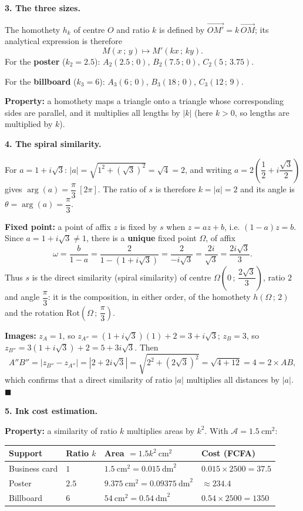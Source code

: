 \documentclass[11pt]{article}
\newcommand{\cle}[1]{{\popxbold\color{popdark}#1}}
\begin{document}
\textbf{3. The three sizes.}\par
The homothety $h_k$ of centre $O$ and ratio $k$ is defined by $\overrightarrow{OM'} = k\,\overrightarrow{OM}$; its analytical expression is therefore
\[ M(x\,;\,y) \longmapsto M'(kx\,;\,ky). \]
For the \textbf{poster} ($k_2 = 2.5$): $A_2(2.5\,;\,0)$, $B_2(7.5\,;\,0)$, $C_2(5\,;\,3.75)$.\par
For the \textbf{billboard} ($k_3 = 6$): $A_3(6\,;\,0)$, $B_3(18\,;\,0)$, $C_3(12\,;\,9)$.\par
\textbf{Property:} a homothety maps a triangle onto a triangle whose corresponding sides are parallel, and it multiplies all lengths by $|k|$ (here $k > 0$, so lengths are multiplied by $k$).

\textbf{4. The spiral similarity.}\par
For $a = 1 + i\sqrt{3}$: $|a| = \sqrt{1^{2} + (\sqrt{3})^{2}} = \sqrt{4} = 2$, and writing $a = 2\left(\dfrac{1}{2} + i\dfrac{\sqrt{3}}{2}\right)$ gives $\arg(a) = \dfrac{\pi}{3}\ [2\pi]$. The ratio of $s$ is therefore $k = |a| = 2$ and its angle is $\theta = \arg(a) = \dfrac{\pi}{3}$.\par
\textbf{Fixed point:} a point of affix $z$ is fixed by $s$ when $z = az + b$, i.e. $(1-a)z = b$. Since $a = 1 + i\sqrt{3} \neq 1$, there is a \textbf{unique} fixed point $\Omega$, of affix
\[ \omega = \frac{b}{1 - a} = \frac{2}{1 - (1 + i\sqrt{3})} = \frac{2}{-i\sqrt{3}} = \frac{2i}{\sqrt{3}} = \frac{2i\sqrt{3}}{3}. \]
Thus $s$ is the \cle{direct similarity} (spiral similarity) of centre $\Omega\left(0\,;\,\dfrac{2\sqrt{3}}{3}\right)$, ratio $2$ and angle $\dfrac{\pi}{3}$: it is the composition, in either order, of the homothety $h\!\left(\Omega\,;\,2\right)$ and the rotation $\mathrm{Rot}\!\left(\Omega\,;\,\dfrac{\pi}{3}\right)$.\par
\textbf{Images:} $z_A = 1$, so $z_{A''} = (1 + i\sqrt{3})(1) + 2 = 3 + i\sqrt{3}$; $z_B = 3$, so $z_{B''} = 3(1 + i\sqrt{3}) + 2 = 5 + 3i\sqrt{3}$. Then
\[ A''B'' = |z_{B''} - z_{A''}| = |2 + 2i\sqrt{3}| = \sqrt{2^{2} + (2\sqrt{3})^{2}} = \sqrt{4 + 12} = 4 = 2 \times AB, \]
which confirms that a direct similarity of ratio $|a|$ multiplies all distances by $|a|$. $\blacksquare$

\textbf{5. Ink cost estimation.}\par
\textbf{Property:} a similarity of ratio $k$ multiplies areas by $k^{2}$. With $\mathcal{A} = 1.5\ \mathrm{cm}^2$:
\begin{center}
\begin{tabularx}{\linewidth}{|l|X|X|X|}
\hline
\rowcolor{popblueL} \textbf{Support} & \textbf{Ratio} $k$ & \textbf{Area} $= 1.5k^{2}\ \mathrm{cm}^2$ & \textbf{Cost} (FCFA) \\
\hline
Business card & $1$ & $1.5\ \mathrm{cm}^2 = 0.015\ \mathrm{dm}^2$ & $0.015 \times 2500 = 37.5$ \\
\hline
Poster & $2.5$ & $9.375\ \mathrm{cm}^2 = 0.09375\ \mathrm{dm}^2$ & $\approx 234.4$ \\
\hline
Billboard & $6$ & $54\ \mathrm{cm}^2 = 0.54\ \mathrm{dm}^2$ & $0.54 \times 2500 = 1350$ \\
\hline
\end{tabularx}
\end{center}
\end{document}
